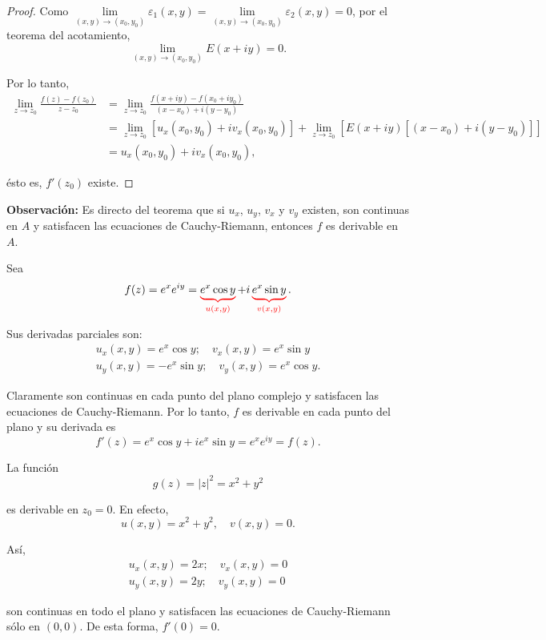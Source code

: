 \begin{proof}
Como $\lim\limits_{(x,y) \to (x_0,y_0)} \varepsilon_1(x,y) = \lim\limits_{(x,y) \to (x_0,y_0)} \varepsilon_2(x,y) = 0$, por el teorema del acotamiento,
$$\lim_{(x,y) \to (x_0,y_0)} E(x+iy) = 0.$$

Por lo tanto, 
\begin{align*}
    \lim_{z \to z_0} \frac{f(z)-f(z_0)}{z-z_0} &= \lim_{z \to z_0} \frac{f(x+iy)-f(x_0 + iy_0)}{(x-x_0) + i (y- y_0)} \\ 
    &= \lim_{z \to z_0} \left[ u_x(x_0,y_0) + i v_x(x_0,y_0) \right] + \lim_{z \to z_0} \left[E(x+iy) [(x-x_0) + i(y-y_0)] \right] \\
    &= u_x(x_0,y_0) + i v_x(x_0,y_0),
\end{align*}

ésto es, $f'(z_0)$ existe.

\end{proof}

\textbf{Observación:} Es directo del teorema que si $u_x$, $u_y$, $v_x$ y $v_y$ existen, son continuas en $A$ y satisfacen las ecuaciones de Cauchy-Riemann, entonces $f$ es derivable en $A$.

\begin{ejemplo}
Sea 
$$f(z) = e^x e^{iy} = \color{red}\underbrace{\color{black}e^x \cos y}_{\color{red} u(x,y)} \color{black}+ i \color{red}\underbrace{\color{black}e^x \sin y}_{\color{red}v(x,y)}\color{black}.$$

Sus derivadas parciales son:
\begin{eqnarray*}
u_x(x,y) = e^x \cos y; \quad v_x(x,y) = e^x \sin y \\
u_y(x,y) = - e^x \sin y; \quad v_y(x,y) = e^x \cos y  .
\end{eqnarray*}

Claramente son continuas en cada punto del plano complejo y satisfacen las ecuaciones de Cauchy-Riemann.  Por lo tanto, $f$ es derivable en cada punto del plano y su derivada es 
$$f'(z) = e^x \cos y + i e^x \sin y = e^x e^{iy} = f(z).$$
\end{ejemplo}

\begin{ejemplo}
La función
$$g(z) = |z|^2 = x^2+y^2$$

es derivable en $z_0 = 0$. En efecto,
$$u(x,y) = x^2+y^2, \quad v(x,y) = 0.$$

Así, 
\begin{eqnarray*}
u_x(x,y) = 2x; \quad v_x(x,y) = 0 \\
u_y(x,y) = 2y; \quad v_y(x,y) = 0  
\end{eqnarray*}

son continuas en todo el plano y satisfacen las ecuaciones de Cauchy-Riemann sólo en $(0,0)$.
De esta forma, $f'(0) = 0$.
\end{ejemplo}

